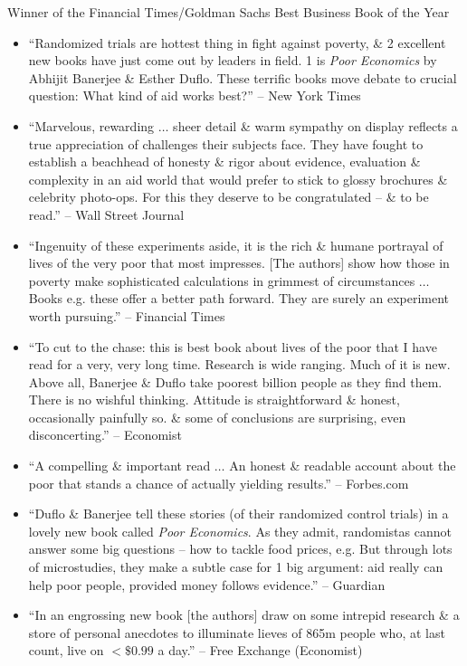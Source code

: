 \documentclass{article}
\begin{document}
\begin{enumerate}
	Winner of the Financial Times/Goldman Sachs Best Business Book of the Year
	\begin{itemize}
		\item ``Randomized trials are hottest thing in fight against poverty, \& 2 excellent new books have just come out by leaders in field. 1 is {\it Poor Economics} by {\sc Abhijit Banerjee \& Esther Duflo}. These terrific books move debate to crucial question: What kind of aid works best?'' -- New York Times
		\item ``Marvelous, rewarding $\ldots$ sheer detail \& warm sympathy on display reflects a true appreciation of challenges their subjects face. They have fought to establish a beachhead of honesty \& rigor about evidence, evaluation \& complexity in an aid world that would prefer to stick to glossy brochures \& celebrity photo-ops. For this they deserve to be congratulated -- \& to be read.'' -- Wall Street Journal
		\item ``Ingenuity of these experiments aside, it is the rich \& humane portrayal of lives of the very poor that most impresses. [The authors] show how those in poverty make sophisticated calculations in grimmest of circumstances $\ldots$ Books e.g. these offer a better path forward. They are surely an experiment worth pursuing.'' -- Financial Times
		\item ``To cut to the chase: this is best book about lives of the poor that I have read for a very, very long time. Research is wide ranging. Much of it is new. Above all, {\sc Banerjee \& Duflo} take poorest billion people as they find them. There is no wishful thinking. Attitude is straightforward \& honest, occasionally painfully so. \& some of conclusions are surprising, even disconcerting.'' -- Economist
		\item ``A compelling \& important read $\ldots$ An honest \& readable account about the poor that stands a chance of actually yielding results.'' -- Forbes.com
		\item ``{\sc Duflo \& Banerjee} tell these stories (of their randomized control trials) in a lovely new book called {\it Poor Economics}. As they admit, randomistas cannot answer some big questions -- how to tackle food prices, e.g. But through lots of microstudies, they make a subtle case for 1 big argument: aid really can help poor people, provided money follows evidence.'' -- Guardian
		\item ``In an engrossing new book [the authors] draw on some intrepid research \& a store of personal anecdotes to illuminate lieves of 865m people who, at last count, live on $< \$0.99$ a day.'' -- Free Exchange (Economist)

\end{itemize}
\end{enumerate}
\end{document}
